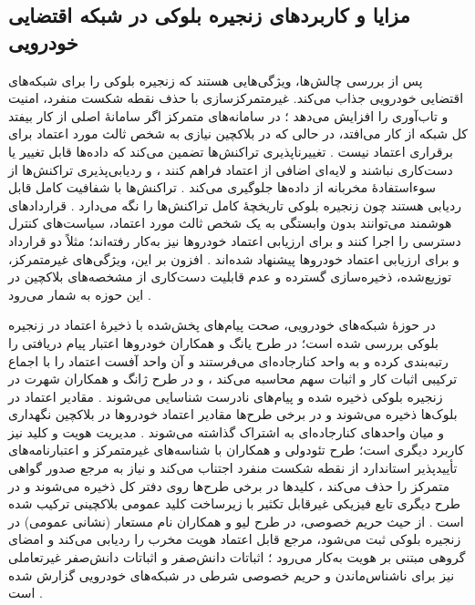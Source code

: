 \subsection{مزایا و کاربردهای زنجیره بلوکی در شبکه اقتضایی خودرویی}

پس از بررسی چالش‌ها، ویژگی‌هایی هستند که زنجیره بلوکی را برای شبکه‌های اقتضایی خودرویی جذاب می‌کند. غیرمتمرکزسازی با حذف نقطه شکست منفرد، امنیت و تاب‌آوری را افزایش می‌دهد \cite{razaBlockchainBasedReputationTrust2024}؛ در سامانه‌های متمرکز اگر سامانهٔ اصلی از کار بیفتد کل شبکه از کار می‌افتد، در حالی که در بلاکچین نیازی به شخص ثالث مورد اعتماد برای برقراری اعتماد نیست \cite{ghovanlooyghajarSBTMSScalableBlockchain2021}. تغییرناپذیری تراکنش‌ها تضمین می‌کند که داده‌ها قابل تغییر یا دست‌کاری نباشند و لایه‌ای اضافی از اعتماد فراهم کنند \cite{razaBlockchainBasedReputationTrust2024}، و ردیابی‌پذیری تراکنش‌ها از سوءاستفادهٔ مخربانه از داده‌ها جلوگیری می‌کند \cite{razaBlockchainBasedReputationTrust2024}. تراکنش‌ها با شفافیت کامل قابل ردیابی هستند چون زنجیره بلوکی تاریخچهٔ کامل تراکنش‌ها را نگه می‌دارد \cite{razaBlockchainBasedReputationTrust2024}. قراردادهای هوشمند می‌توانند بدون وابستگی به یک شخص ثالث مورد اعتماد، سیاست‌های کنترل دسترسی را اجرا کنند \cite{razaBlockchainBasedReputationTrust2024} و برای ارزیابی اعتماد خودروها نیز به‌کار رفته‌اند؛ مثلاً دو قرارداد  و  برای ارزیابی اعتماد خودروها پیشنهاد شده‌اند \cite{razaBlockchainBasedReputationTrust2024}. افزون بر این، ویژگی‌های غیرمتمرکز، توزیع‌شده، ذخیره‌سازی گسترده و عدم قابلیت دست‌کاری از مشخصه‌های بلاکچین در این حوزه به شمار می‌رود \cite{ghovanlooyghajarSBTMSScalableBlockchain2021}.

در حوزهٔ شبکه‌های خودرویی، صحت پیام‌های پخش‌شده با ذخیرهٔ اعتماد در زنجیره بلوکی بررسی شده است؛ در طرح یانگ و همکاران خودروها اعتبار پیام دریافتی را رتبه‌بندی کرده و به واحد کنارجاده‌ای می‌فرستند و آن واحد آفست اعتماد را با اجماع ترکیبی اثبات کار و اثبات سهم محاسبه می‌کند \cite{razaBlockchainBasedReputationTrust2024}، و در طرح ژانگ و همکاران شهرت در زنجیره بلوکی ذخیره شده و پیام‌های نادرست شناسایی می‌شوند \cite{razaBlockchainBasedReputationTrust2024}. مقادیر اعتماد در بلوک‌ها ذخیره می‌شوند \cite{razaBlockchainBasedReputationTrust2024} و در برخی طرح‌ها مقادیر اعتماد خودروها در بلاکچین نگهداری و میان واحدهای کنارجاده‌ای به اشتراک گذاشته می‌شوند \cite{farsimadanReviewSecurityChallenges2025}. مدیریت هویت و کلید نیز کاربرد دیگری است؛ طرح تئودولی و همکاران با شناسه‌های غیرمتمرکز و اعتبارنامه‌های تأییدپذیر استاندارد  از نقطه شکست منفرد اجتناب می‌کند و نیاز به مرجع صدور گواهی متمرکز را حذف می‌کند \cite{razaBlockchainBasedReputationTrust2024}، کلیدها در برخی طرح‌ها روی دفتر کل ذخیره می‌شوند \cite{razaBlockchainBasedReputationTrust2024} و در طرح دیگری تابع فیزیکی غیرقابل تکثیر با زیرساخت کلید عمومی بلاکچینی ترکیب شده است \cite{razaBlockchainBasedReputationTrust2024}. از حیث حریم خصوصی، در طرح لیو و همکاران نام مستعار (نشانی عمومی) در زنجیره بلوکی ثبت می‌شود، مرجع قابل اعتماد هویت مخرب را ردیابی می‌کند و امضای گروهی مبتنی بر هویت به‌کار می‌رود \cite{razaBlockchainBasedReputationTrust2024}؛ اثباتات دانش‌صفر و اثباتات دانش‌صفر غیرتعاملی نیز برای ناشناس‌ماندن و حریم خصوصی شرطی در شبکه‌های خودرویی گزارش شده است \cite{razaBlockchainBasedReputationTrust2024}.

